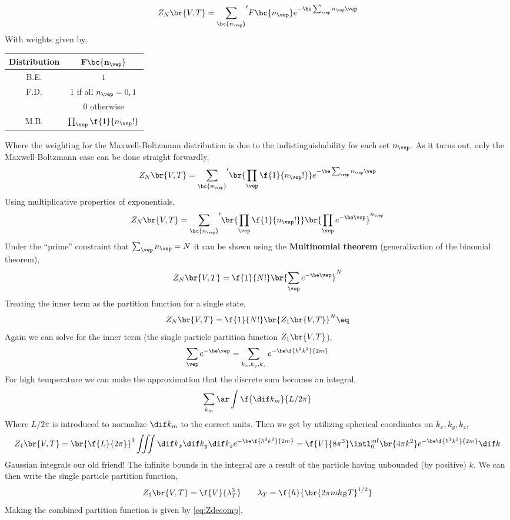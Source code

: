 \documentclass{article}
\begin{document}
{\[ Z_{N}\br{V,T} = {\sum_{\bc{n_\vep}}}' F\bc{n_\vep} e^{-\be \sum_{\vep} n_\vep \vep} \]
With weights given by,
\begin{center}
\begin{tabular}{|c|c|}
    \hline
    \textbf{Distribution} & $\mathbf{F\bc{n_\vep}}$ \\
    \hline
    B.E. & $1$ \\
    \hline
    F.D. & $1$ if all $n_\vep = 0,1$ \\
         & $0$ otherwise \\
    \hline
    M.B. & $\prod_\vep \f{1}{n_\vep !}$\\
    \hline
\end{tabular}
\end{center}
Where the weighting for the Maxwell-Boltzmann distribution is due to the indistinguishability for each set $n_\vep$. As it turns out, only the Maxwell-Boltzmann case can be done straight forwardly,
\[ Z_{N}\br{V,T} = {\sum_{\bc{n_\vep}}}' \br{\prod_\vep \f{1}{n_\vep !}} e^{-\be \sum_{\vep} n_\vep \vep} \]
Using multiplicative properties of exponentials,
\[ Z_{N}\br{V,T} = {\sum_{\bc{n_\vep}}}' \br{\prod_\vep \f{1}{n_\vep !}} \br{\prod_\vep e^{-\be \vep}}^{n_\vep} \]
Under the ``prime'' constraint that $\sum_\vep n_\vep = N$ it can be shown using the \textbf{Multinomial theorem} (generalization of the binomial theorem),
\[ Z_{N}\br{V,T} = \f{1}{N!}\br{\sum_\vep e^{-\be \vep}}^N \]
Treating the inner term as the partition function for a single state,
\[ Z_{N}\br{V,T} = \f{1}{N!}\br{Z_1\br{V,T}}^N \eq \label{eq:Zdecomp}\]
Again we can solve for the inner term (the single particle partition function $Z_{1}\br{V,T}$),
\[ \sum_\vep e^{-\be \vep} = \sum_{k_x,k_y,k_z}e^{-\be\f{\hbar^2 k^2}{2m}} \]
For high temperature we can make the approximation that the discrete sum becomes an integral,
\[ \sum_{k_m} \ar \int \f{\dif k_m}{L /2 \pi} \]
Where $L/2\pi$ is introduced to normalize $\dif k_m$ to the correct units. Then we get by utilizing spherical coordinates on $k_x,k_y,k_z$,
\[ Z_{1}\br{V,T} = \br{\f{L}{2\pi}}^3 \iiint \dif k_x \dif k_y \dif k_z e^{-\be\f{\hbar^2 k^2}{2m}} = \f{V}{8 \pi^3} \intl_{0}^{\inf} \br{4\pi k^2} e^{-\be \f{\hbar^2 k^2}{2m}} \dif k\]
Gaussian integrals our old friend! The infinite bounds in the integral are a result of the particle having unbounded (by positive) $k$. We can then write the single particle partition function,
\[ Z_{1}\br{V,T} = \f{V}{\lambda_T^3} \qquad \lambda_T = \f{h}{\br{2 \pi m k_B T}^{1/2}} \]
Making the combined partition function is given by \eqref{eq:Zdecomp},
}
\end{document}
